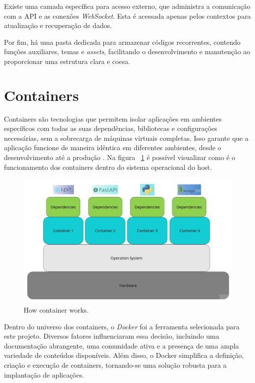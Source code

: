 Existe uma camada específica para acesso externo, que administra a comunicação com a \gls{API} e as conexões \textit{WebSocket}. Esta é acessada apenas pelos contextos para atualização e recuperação de dados.

Por fim, há uma pasta dedicada para armazenar códigos recorrentes, contendo funções auxiliares, temas e \textit{assets}, facilitando o desenvolvimento e manutenção ao proporcionar uma estrutura clara e coesa.


\section{Containers}
Containers são tecnologias que permitem isolar aplicações em ambientes específicos com todas as suas dependências, bibliotecas e configurações necessárias, sem a sobrecarga de máquinas virtuais completas. Isso garante que a aplicação funcione de maneira idêntica em diferentes ambientes, desde o desenvolvimento até a produção \cite{paraiso2016model}. Na figura ~\ref{fig:container} é possível visualizar como é o funcionamento dos containers dentro do sistema operacional do host.

\begin{figure}[htbp]
	\centering
	\includegraphics[width=\textwidth]{images/container.jpg}
	\caption{How container works.}
	\label{fig:container}
\end{figure}

Dentro do universo dos containers, o \textit{Docker} \cite{dockerDocs} foi a ferramenta selecionada para este projeto. Diversos fatores influenciaram essa decisão, incluindo uma documentação abrangente, uma comunidade ativa e a presença de uma ampla variedade de conteúdos disponíveis. Além disso, o Docker simplifica a definição, criação e execução de containers, tornando-se uma solução robusta para a implantação de aplicações.

